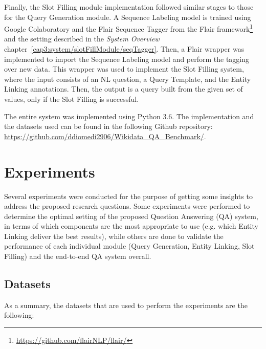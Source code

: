 Finally, the Slot Filling module implementation followed similar stages to those for the Query 
Generation module. A Sequence Labeling model is trained using Google Colaboratory and the Flair 
Sequence Tagger from the Flair framework\footnote{\url{https://github.com/flairNLP/flair/}} and 
the setting described in the \textit{System Overview} chapter~\ref{cap3:system/slotFillModule/seqTagger}. 
Then, a Flair wrapper was implemented to import the Sequence Labeling model and perform the 
tagging over new data. This wrapper was used to implement the Slot Filling system, where the 
input consists of an NL question, a Query Template, and the Entity Linking annotations. Then, 
the output is a \SPARQL{} query built from the given set of values, only if the Slot Filling is 
successful.

The entire system was implemented using Python 3.6. The implementation and the datasets used can 
be found in the following Github repository: \url{https://github.com/ddiomedi2906/Wikidata_QA_Benchmark/}.

\section{Experiments}
\label{cap4:experimentalDesign/experiments}
Several experiments were conducted for the purpose of getting some insights to address the 
proposed research questions. Some experiments were performed to determine the optimal setting of 
the proposed Question Answering (QA) system, in terms of which components are the most 
appropriate to use (e.g. which Entity Linking deliver the best results), while others are done 
to validate the performance of each individual module (Query Generation, Entity Linking, Slot 
Filling) and the end-to-end QA system overall.

\subsection{Datasets}
\label{cap4:experimentalDesign/datasets}
As a summary, the datasets that are used to perform the experiments are the following:

